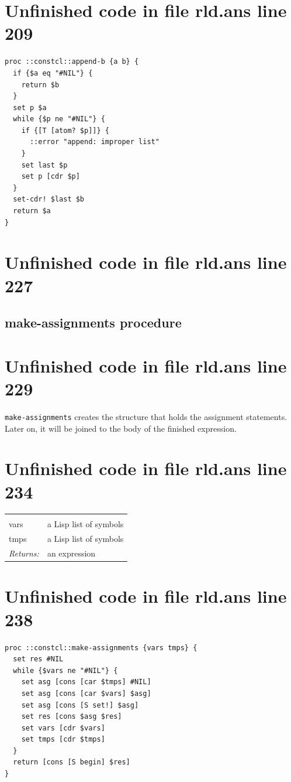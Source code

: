\documentclass[twoside,9pt]{report}
\begin{document}
\section{Unfinished code in file rld.ans line 209}
\begin{lstlisting}
proc ::constcl::append-b {a b} {
  if {$a eq "#NIL"} {
    return $b
  }
  set p $a
  while {$p ne "#NIL"} {
    if {[T [atom? $p]]} {
      ::error "append: improper list"
    }
    set last $p
    set p [cdr $p]
  }
  set-cdr! $last $b
  return $a
}
\end{lstlisting}
\section{Unfinished code in file rld.ans line 227}
\subsection{make-assignments procedure}
\label{make-assignments-procedure}
\section{Unfinished code in file rld.ans line 229}


\texttt{make-assignments} creates the structure that holds the assignment statements. Later on, it will be joined to the body of the finished expression.

\section{Unfinished code in file rld.ans line 234}
\noindent\begin{tabular}{ |p{1.9cm} p{8cm}| }
\hline
\rowcolor[HTML]{CCCCCC} \multicolumn{2}{|l|}{\bf make-assignments (internal)} \\
vars & a Lisp list of symbols \\
tmps & a Lisp list of symbols \\
\textit{Returns:} & an expression \\
\hline
\end{tabular}
\section{Unfinished code in file rld.ans line 238}
\begin{lstlisting}
proc ::constcl::make-assignments {vars tmps} {
  set res #NIL
  while {$vars ne "#NIL"} {
    set asg [cons [car $tmps] #NIL]
    set asg [cons [car $vars] $asg]
    set asg [cons [S set!] $asg]
    set res [cons $asg $res]
    set vars [cdr $vars]
    set tmps [cdr $tmps]
  }
  return [cons [S begin] $res]
}
\end{lstlisting}
\end{document}
